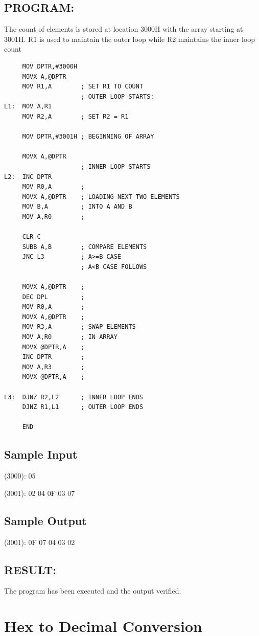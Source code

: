 \documentclass[a4paper,28pt,twoside,openright]{report}
\begin{document}
\section*{PROGRAM:}
The count of elements is stored at location 3000H with the array starting at 3001H. R1 is used to maintain the outer loop while R2 maintains the inner loop count
\begin{lstlisting}
     MOV DPTR,#3000H
     MOVX A,@DPTR
     MOV R1,A        ; SET R1 TO COUNT
                     ; OUTER LOOP STARTS:
L1:  MOV A,R1
     MOV R2,A        ; SET R2 = R1
     
     MOV DPTR,#3001H ; BEGINNING OF ARRAY
     
     MOVX A,@DPTR
                     ; INNER LOOP STARTS
L2:  INC DPTR 
     MOV R0,A        ;
     MOVX A,@DPTR    ; LOADING NEXT TWO ELEMENTS
     MOV B,A         ; INTO A AND B 
     MOV A,R0        ;
     
     CLR C
     SUBB A,B        ; COMPARE ELEMENTS
     JNC L3          ; A>=B CASE
                     ; A<B CASE FOLLOWS
            
     MOVX A,@DPTR    ;
     DEC DPL         ;
     MOV R0,A        ;
     MOVX A,@DPTR    ; 
     MOV R3,A        ; SWAP ELEMENTS
     MOV A,R0        ; IN ARRAY
     MOVX @DPTR,A    ;
     INC DPTR        ;
     MOV A,R3        ;
     MOVX @DPTR,A    ;
     
L3:  DJNZ R2,L2      ; INNER LOOP ENDS
     DJNZ R1,L1      ; OUTER LOOP ENDS
     
     END
\end{lstlisting}

\section*{Sample Input}
(3000): 05

(3001): 02
 04
 0F
 03
 07

\section*{Sample Output}
(3001): 0F 
 07 
 04
 03
 02

\section*{RESULT:}
The program has been executed and the output verified.
%
%
\chapter{Hex to Decimal Conversion}
\end{document}
